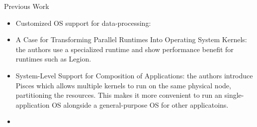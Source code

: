 \begin{block}{Previous Work}
  \begin{itemize}
  \item Customized OS support for data-processing: 
  \item A Case for Transforming Parallel Runtimes Into Operating System Kernels: the authors use a specialized runtime and show performance benefit for runtimes such as Legion.
  \item System-Level Support for Composition of Applications: the authors introduce Pisces which allows multiple kernels to run on the same physical node, partitioning the resources. This makes it more convenient to run an single-application OS alongside a general-purpose OS for other applicatoins.
  \item {}
  \end{itemize}
  
\end{block}
